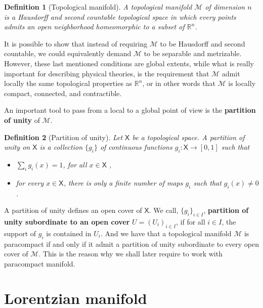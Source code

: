 \documentclass[11pt]{book}
\newcommand{\Mcal}{\mathcal{M}}
\newcommand{\Rbb}{\mathbb{R}}
\newcommand{\Xsf}{\mathsf{X}}
\theoremstyle{break}
\newtheorem{definition}{Definition}[chapter]
\begin{document}
\bigskip


\begin{definition}[Topological manifold]
A topological manifold $\Mcal$ of dimension $n$ is a Hausdorff and second countable topological space in which every points admits an open neighborhood homeomorphic to a subset of $\Rbb^n$.
\end{definition}


It is possible to show that instead of requiring $\Mcal$ to be Hausdorff and second countable, we could equivalently demand $\Mcal$ to be separable and metrizable. However, these last mentioned conditions are global extents, while what is really important for describing physical theories, is the requirement that $\Mcal$ admit locally the same topological properties as $\Rbb^n$, or in other words that  $\Mcal$ is locally compact, connected, and contractible.


An important tool to pass from a local to a global point of view is the \textbf{partition of unity} of $\Mcal$. 


\begin{definition}[Partition of unity]
Let $\Xsf$ be a topological space. A partition of unity on $\Xsf$ is a collection $\{g_i\}$ of continuous functions $g_i : \Xsf \to [0,1]$ such that
%
\begin{itemize}
\item $\sum_i g_i(x) = 1$, for all $x \in \Xsf$ ,
\item for every $x \in \Xsf$, there is only a finite number of maps $g_i$ such that $g_i(x) \neq 0$.
\end{itemize}
%
\end{definition}


A partition of unity defines an open cover of $\Xsf$. We call, $\{g_i\}_{i \in I}$, \textbf{partition of unity subordinate to an open cover} $U=(U_i)_{i \in I}$, if for all $i \in I$, the support of $g_i$ is contained in $U_i$. And we have that a topological manifold $\Mcal$ is paracompact if and only if it admit a partition of unity subordinate to every open cover of $\Mcal$. This is the reason why we shall later require to work with paracompact manifold.


\section{Lorentzian manifold}
\end{document}
